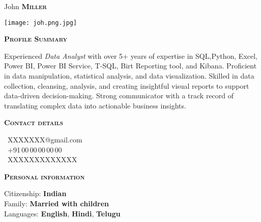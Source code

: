\documentclass[11pt, a4paper]{article}
\newcommand{\headleft}[1]{\vspace*{3ex}\textsc{\textbf{#1}}\par%
    \vspace*{-1.5ex}\hrulefill\par\vspace*{0.7ex}}
\begin{document}
\setlength{\topskip}{0pt}
\setlength{\parindent}{0pt}
\setlength{\parskip}{0pt}
\setlength{\fboxsep}{0pt}
\pagestyle{empty}
\raggedbottom

\begin{minipage}[t]{0.33\textwidth} %
\colorbox{cvblue}{\begin{minipage}[t][5mm][t]{\textwidth}\null\hfill\null\end{minipage}}

\vspace{-.2ex} %
\colorbox{cvblue!90}{\color{white}  %
\textwidth\relax%
\begin{minipage}[t][293mm][t]{0.82\textwidth}
\raggedright
\vspace*{2.5ex}

\Large John \textbf{\textsc{Miller}} \normalsize 

\null\hfill\texttt{[image: joh.png.jpg]}\hfill\null

\vspace*{0.5ex} %

\headleft{Profile Summary}
Experienced \textit{Data Analyst} with over 5+ years of expertise in SQL,Python, Excel, Power BI, Power BI Service, T-SQL, Birt Reporting tool, and Kibana. Proficient in data manipulation, statistical analysis, and data visualization. Skilled in data collection, cleansing, analysis, and creating insightful visual reports to support data-driven decision-making. Strong communicator with a track record of translating complex data into actionable business insights.

\headleft{Contact details}
\small %
\MVAt\ {\small XXXXXXX@gmail.com} \\[0.4ex]
\Mobilefone\ +91\,00\,00\,00\,00\,00 \\[0.5ex]
\Letter\ XXXXXXXXXXXXX
\normalsize

\headleft{Personal information}
Citizenship: \textbf{Indian} \\[0.5ex]
Family: \textbf{Married with children} \\[0.5ex]
Languages: \textbf{English}, \textbf{Hindi}, \textbf{Telugu}


\end{minipage}}
\end{minipage}
\end{document}
